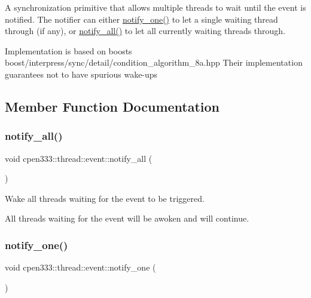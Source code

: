 A synchronization primitive that allows multiple threads to wait until the event is notified. The notifier can either {\ttfamily \hyperlink{classcpen333_1_1thread_1_1event_a453552a68dff5c45321496e452495364}{notify\+\_\+one()}} to let a single waiting thread through (if any), or {\ttfamily \hyperlink{classcpen333_1_1thread_1_1event_ac41756fc84760cd537c78de31b3b25fa}{notify\+\_\+all()}} to let all currently waiting threads through.

Implementation is based on boost\textquotesingle{}s boost/interpress/sync/detail/condition\+\_\+algorithm\+\_\+8a.\+hpp Their implementation guarantees not to have spurious wake-\/ups 

\subsection{Member Function Documentation}
\mbox{\label{classcpen333_1_1thread_1_1event_ac41756fc84760cd537c78de31b3b25fa}} 
\subsubsection{\texorpdfstring{notify\+\_\+all()}{notify\_all()}}
{\footnotesize\ttfamily void cpen333\+::thread\+::event\+::notify\+\_\+all (\begin{DoxyParamCaption}{ }\end{DoxyParamCaption})\hspace{0.3cm}{\ttfamily [inline]}}



Wake all threads waiting for the event to be triggered. 

All threads waiting for the event will be awoken and will continue. \mbox{\label{classcpen333_1_1thread_1_1event_a453552a68dff5c45321496e452495364}} 
\subsubsection{\texorpdfstring{notify\+\_\+one()}{notify\_one()}}
{\footnotesize\ttfamily void cpen333\+::thread\+::event\+::notify\+\_\+one (\begin{DoxyParamCaption}{ }\end{DoxyParamCaption})\hspace{0.3cm}{\ttfamily [inline]}}



